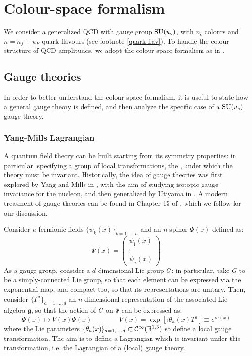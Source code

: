 \section{Colour-space formalism}
\label{sec:colour-space}

We consider a generalized QCD with gauge group $ \mathrm{SU}(n_c) $, with $ n_c $ colours and $ n = n_f + n_F $ quark flavours (see footnote \ref{quark-flav}). To handle the colour structure of QCD amplitudes, we adopt the colour-space formalism as in \cite{Catani-1997}.

\subsection{Gauge theories}
\label{ssec:gauge-th}

In order to better understand the colour-space formalism, it is useful to state how a general gauge theory is defined, and then analyze the specific case of a $ \mathrm{SU}(n_c) $ gauge theory.

\subsubsection{Yang-Mills Lagrangian}

A quantum field theory can be built starting from its symmetry properties: in particular, specifying a group of local transformations, the , under which the theory must be invariant. Historically, the idea of gauge theories was first explored by Yang and Mills in \cite{Yang-1954}, with the aim of studying isotopic gauge invariance for the nucleon, and then generalized by Utiyama in \cite{Utiyama-1956}. A modern treatment of gauge theories can be found in Chapter 15 of \cite{Peskin-1995}, which we follow for our discussion.

Consider $ n $ fermionic fields $ \{\psi_k(x)\}_{k = 1, \dots, n} $ and an $ n $-spinor $ \Psi(x) $ defined as:
\begin{equation}
  \Psi(x) =
  \begin{pmatrix}
    \psi_1(x) \\ \vdots \\ \psi_n(x)
  \end{pmatrix}
\end{equation}
As a gauge group, consider a $ d $-dimensional Lie group $ G $: in particular, take $ G $ to be a simply-connected Lie group, so that each element can be expressed via the exponential map, and compact too, so that its representations are unitary. Then, consider $ \{T^a\}_{a = 1, \dots, d} $ an $ n $-dimensional representation of the associated Lie algebra $ \mathfrak{g} $, so that the action of $ G $ on $ \Psi $ can be expressed as:
\begin{equation}
  \Psi(x) \mapsto V(x) \Psi(x)
  \qquad \qquad
  V(x) = \exp \left[ i \theta_a(x) T^a \right] \equiv e^{i \alpha(x)}
  \label{eq:gauge-trans}
\end{equation}
where the Lie parameters $ \{\theta_a(x)\}_{a = 1, \dots, d} \subset \mathcal{C}^\infty(\mathbb{R}^{1,3}) $ so define a local gauge transformation. The aim is to define a Lagrangian which is invariant under this transformation, i.e. the Lagrangian of a (local) gauge theory.

